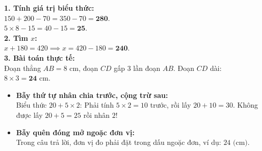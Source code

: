 \documentclass[12pt,a4paper]{article}
\begin{document}
\vspace{-2.5mm}
\noindent
\begin{minipage}[t]{0.49\textwidth}\vspace{0pt}
\begin{tcolorbox}[
  enhanced,
  colback=green!4!white,
  colframe=green!60!black,
  arc=2mm, boxrule=0.8pt,
  left=2mm, right=2mm, top=1.8mm, bottom=1.8mm,
  title={\footnotesize\bfseries\color{white}\faCheckCircle\ Ví dụ thực hành chuẩn mực}
]
{\footnotesize
\textbf{1. Tính giá trị biểu thức:}\\
$150 + 200 - 70 = 350 - 70 = \mathbf{280}$.\\
$5 \times 8 - 15 = 40 - 15 = \mathbf{25}$.\\
\textbf{2. Tìm $x$:}\\
$x + 180 = 420 \implies x = 420 - 180 = \mathbf{240}$.\\
\textbf{3. Bài toán thực tế:}\\
Đoạn thẳng $AB = 8\text{ cm}$, đoạn $CD$ gấp $3$ lần đoạn $AB$. Đoạn $CD$ dài: $8 \times 3 = \mathbf{24}\text{ cm}$.
}
\end{tcolorbox}
\end{minipage}
\hfill
\begin{minipage}[t]{0.49\textwidth}\vspace{0pt}
\begin{tcolorbox}[
  enhanced,
  colback=red!4!white,
  colframe=red!70!black,
  arc=2mm, boxrule=0.8pt,
  left=2mm, right=2mm, top=1.8mm, bottom=1.8mm,
  title={\footnotesize\bfseries\color{white}\faExclamationTriangle\ Mẹo tránh bẫy trắc nghiệm}
]
{\footnotesize
\begin{itemize}\setlength{\itemsep}{1.5pt}\setlength{\leftskip}{-2.5mm}
  \item \textbf{Bẫy thứ tự nhân chia trước, cộng trừ sau:}\\
  Biểu thức $20 + 5 \times 2$: Phải tính $5 \times 2 = 10$ trước, rồi lấy $20 + 10 = 30$. Không được lấy $20 + 5 = 25$ rồi nhân $2$!
  \item \textbf{Bẫy quên đóng mở ngoặc đơn vị:}\\
  Trong câu trả lời, đơn vị đo phải đặt trong dấu ngoặc đơn, ví dụ: $24\text{ (cm)}$.
\end{itemize}
}
\end{tcolorbox}
\end{minipage}
\end{document}
